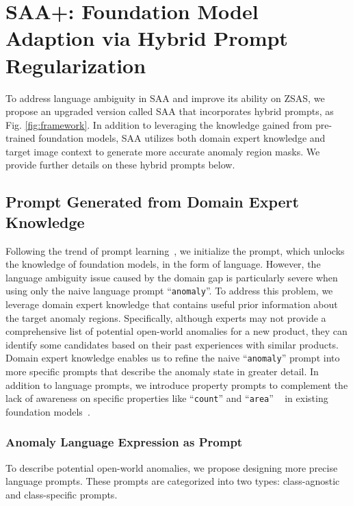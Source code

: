 \documentclass{article}
\begin{document}
\section{SAA+: Foundation Model Adaption via Hybrid Prompt Regularization}
\label{sec:method}  

To address language ambiguity in SAA and improve its ability on ZSAS, we propose an upgraded version called SAA that incorporates hybrid prompts, as Fig. \ref{fig:framework}. In addition to leveraging the knowledge gained from pre-trained foundation models, SAA utilizes both domain expert knowledge and target image context to generate more accurate anomaly region masks. We provide further details on these hybrid prompts below.

\subsection{Prompt Generated from Domain Expert Knowledge}

Following the trend of prompt learning~\cite{zhou_conditional,zhou_learning_2022}, we initialize the prompt, which unlocks the knowledge of foundation models, in the form of language. However, the language ambiguity issue caused by the domain gap is particularly severe when using only the naive language prompt ``\verb|anomaly|''. To address this problem, we leverage domain expert knowledge that contains useful prior information about the target anomaly regions. Specifically, although experts may not provide a comprehensive list of potential open-world anomalies for a new product, they can identify some candidates based on their past experiences with similar products. Domain expert knowledge enables us to refine the naive ``\verb|anomaly|'' prompt into more specific prompts that describe the anomaly state in greater detail. In addition to language prompts, we introduce property prompts to complement the lack of awareness on specific properties like ``\verb|count|'' and ``\verb|area|'' ~\cite{paiss_count_2023} in existing foundation models~\cite{paiss_count_2023}.


\subsubsection{Anomaly Language Expression as Prompt}

To describe potential open-world anomalies, we propose designing more precise language prompts. These prompts are categorized into two types: class-agnostic and class-specific prompts. 
\end{document}
